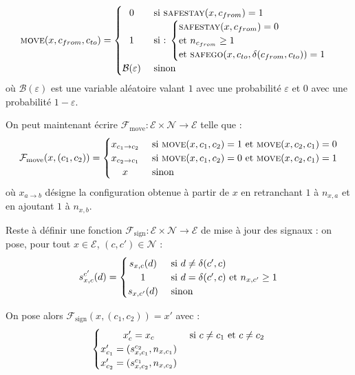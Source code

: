 \documentclass[11pt, openany]{article}
\newcommand{\Ne}{\mathcal{N}}
\newcommand{\Ss}{\textsc{safestay}}
\newcommand{\Sg}{\textsc{safego}}
\newcommand{\M}{\textsc{move}}
\newcommand{\E}{\mathcal{E}}
\begin{document}
\begin{itemize}
{\[    \M(x, c_{from}, c_{to}) = 
    \begin{cases}
      \hfill 0 \hfill & \text{ si $\Ss(x,c_{from})=1$} \\
      \hfill 1 \hfill & \text{ si : }{ \begin{cases} \Ss(x,c_{from})=0 \\\text{et $n_{c_{from}}\geq 1$} \\ \text{et } \Sg(x,c_{to}, \delta(c_{from}, c_{to}))=1\\ \end{cases}}\\
      \hfill \mathcal{B}(\varepsilon)\hfill  & \text{ sinon} \\
    \end{cases}
\]
où $\mathcal{B}(\varepsilon)$ est une variable aléatoire valant $1$ avec une probabilité $\varepsilon$ et $0$ avec une probabilité $1-\varepsilon$.
}


\end{itemize}

\medskip

\noindent
On peut maintenant écrire $\mathcal{F}_{\mathrm{move}} : \E\times\Ne\to\E$ telle que :  \[
\mathcal{F}_{\mathrm{move}}(x,(c_1, c_2)) = 
\begin{cases}
  \hfill x_{c_1\to c_2} \hfill & \text{ si $\M(x, c_1, c_2) = 1$ et $\M(x, c_2, c_1) = 0$} \\
  \hfill x_{c_2 \to c_1} \hfill & \text{ si $\M(x, c_1, c_2) = 0$ et $\M(x, c_2, c_1) = 1$} \\
  \hfill x \hfill & \text{ sinon} \\
  \end{cases}
\]
où $x_{a \to b}$ désigne la configuration obtenue à partir de $x$ en retranchant $1$ à $n_{x, a}$ et en ajoutant $1$ à $n_{x, b}$. 

\medskip
  
\noindent 
Reste à définir une fonction $\mathcal{F}_{\mathrm{sign}} : \E\times\Ne\to\E$ de mise à jour des signaux : on pose, pour tout $x\in\E$, $(c,c')\in\Ne$ : \[
s_{x, c}^{c'}(d) = 
\begin{cases}
  \hfill s_{x, c}(d) \hfill & \text{ si $d \neq \delta(c', c)$} \\
  \hfill 1 \hfill & \text{ si $d = \delta(c', c)$ et $n_{x, c'}\geq 1$} \\
  \hfill s_{x, c'}(d) \hfill & \text{ sinon}\\
\end{cases}
\]

\noindent
On pose alors $\mathcal{F}_{\mathrm{sign}} (x, (c_1, c_2)) = x'$ avec : \[
\begin{cases}
  \hfill x'_c = x_c  \hfill & \text{ si $c\neq c_1$ et $c\neq c_2$} \\
  \hfill x'_{c_1} = (s_{x, c_1}^{c_2}, n_{x,c_1}) \hfill & \\
  \hfill x'_{c_2} = (s_{x, c_2}^{c_1}, n_{x, c_2}) \hfill & \\
\end{cases}
\]
\end{document}

